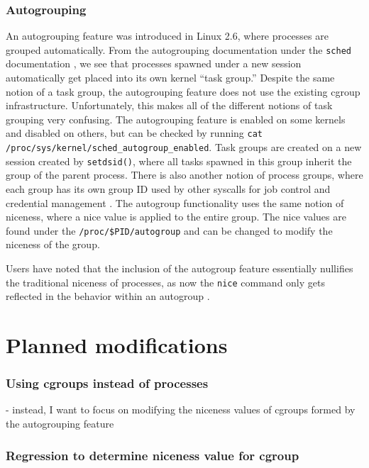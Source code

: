 \documentclass[12pt]{article}
\begin{document}
\subsubsection*{Autogrouping}

An autogrouping feature was introduced in Linux 2.6, where processes are grouped automatically. From the autogrouping documentation under the \texttt{sched} documentation \cite{SchedLinuxManual}, we see that processes spawned under a new session automatically get placed into its own kernel ``task group.'' Despite the same notion of a task group, the autogrouping feature does not use the existing cgroup infrastructure. Unfortunately, this makes all of the different notions of task grouping very confusing. The autogrouping feature is enabled on some kernels and disabled on others, but can be checked by running \texttt{cat /proc/sys/kernel/sched\_autogroup\_enabled}. Task groups are created on a new session created by \texttt{setdsid()}, where all tasks spawned in this group inherit the group of the parent process. There is also another notion of process groups, where each group has its own group ID used by other syscalls for job control and credential management \cite{CredentialsLinuxManual, troanProcessModelLinux2005}. The autogroup functionality uses the same notion of niceness, where a nice value is applied to the entire group. The nice values are found under the \texttt{/proc/\$PID/autogroup} and can be changed to modify the niceness of the group. 

Users have noted that the inclusion of the autogroup feature essentially nullifies the traditional niceness of processes, as now the \texttt{nice} command only gets reflected in the behavior within an autogroup \cite{nburginWhyNiceLevels2019}.  

\section*{Planned modifications}

\subsubsection*{Using cgroups instead of processes}

- instead, I want to focus on modifying the niceness values of cgroups formed by the autogrouping feature

\subsubsection*{Regression to determine niceness value for cgroup}
\end{document}
